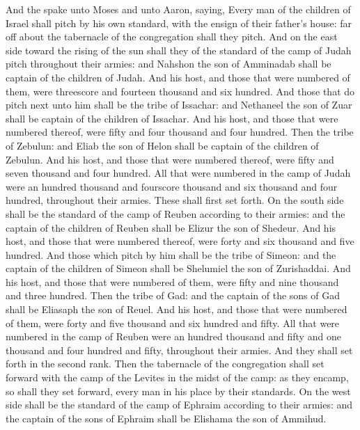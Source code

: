 \begin{biblechapter} %
 And the \LORD spake unto Moses and unto Aaron, saying,
\verse Every man of the children of Israel shall pitch by his own standard, with the ensign of their father's house: far off about the tabernacle of the congregation shall they pitch.
\verse And on the east side toward the rising of the sun shall they of the standard of the camp of Judah pitch throughout their armies: and Nahshon the son of Amminadab shall be captain of the children of Judah.
\verse And his host, and those that were numbered of them, were threescore and fourteen thousand and six hundred.
\verse And those that do pitch next unto him shall be the tribe of Issachar: and Nethaneel the son of Zuar shall be captain of the children of Issachar.
\verse And his host, and those that were numbered thereof, were fifty and four thousand and four hundred.
\verse Then the tribe of Zebulun: and Eliab the son of Helon shall be captain of the children of Zebulun.
\verse And his host, and those that were numbered thereof, were fifty and seven thousand and four hundred.
\verse All that were numbered in the camp of Judah were an hundred thousand and fourscore thousand and six thousand and four hundred, throughout their armies. These shall first set forth.
\verse On the south side shall be the standard of the camp of Reuben according to their armies: and the captain of the children of Reuben shall be Elizur the son of Shedeur.
\verse And his host, and those that were numbered thereof, were forty and six thousand and five hundred.
\verse And those which pitch by him shall be the tribe of Simeon: and the captain of the children of Simeon shall be Shelumiel the son of Zurishaddai.
\verse And his host, and those that were numbered of them, were fifty and nine thousand and three hundred.
\verse Then the tribe of Gad: and the captain of the sons of Gad shall be Eliasaph the son of Reuel.
\verse And his host, and those that were numbered of them, were forty and five thousand and six hundred and fifty.
\verse All that were numbered in the camp of Reuben were an hundred thousand and fifty and one thousand and four hundred and fifty, throughout their armies. And they shall set forth in the second rank.
\verse Then the tabernacle of the congregation shall set forward with the camp of the Levites in the midst of the camp: as they encamp, so shall they set forward, every man in his place by their standards.
\verse On the west side shall be the standard of the camp of Ephraim according to their armies: and the captain of the sons of Ephraim shall be Elishama the son of Ammihud.

\end{biblechapter}
